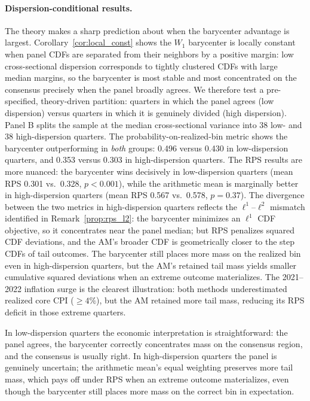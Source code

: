 \paragraph{Dispersion-conditional results.}  The theory makes a sharp prediction about when the barycenter advantage is largest.  Corollary~\ref{cor:local_const} shows the $W_1$ barycenter is locally constant when panel CDFs are separated from their neighbors by a positive margin: low cross-sectional dispersion corresponds to tightly clustered CDFs with large median margins, so the barycenter is most stable and most concentrated on the consensus precisely when the panel broadly agrees.  We therefore test a pre-specified, theory-driven partition: quarters in which the panel agrees (low dispersion) versus quarters in which it is genuinely divided (high dispersion).  Panel B splits the sample at the median cross-sectional variance into 38 low- and 38 high-dispersion quarters.  The probability-on-realized-bin metric shows the barycenter outperforming in \emph{both} groups: 0.496 versus 0.430 in low-dispersion quarters, and 0.353 versus 0.303 in high-dispersion quarters.  The RPS results are more nuanced: the barycenter wins decisively in low-dispersion quarters (mean RPS 0.301 vs.\ 0.328, $p < 0.001$), while the arithmetic mean is marginally better in high-dispersion quarters (mean RPS 0.567 vs.\ 0.578, $p = 0.37$).  The divergence between the two metrics in high-dispersion quarters reflects the $\ell^1$--$\ell^2$ mismatch identified in Remark~\ref{prop:rps_l2}: the barycenter minimizes an $\ell^1$ CDF objective, so it concentrates near the panel median; but RPS penalizes squared CDF deviations, and the AM's broader CDF is geometrically closer to the step CDFs of tail outcomes.  The barycenter still places more mass on the realized bin even in high-dispersion quarters, but the AM's retained tail mass yields smaller cumulative squared deviations when an extreme outcome materializes.  The 2021--2022 inflation surge is the clearest illustration: both methods underestimated realized core CPI ($\geq 4\%$), but the AM retained more tail mass, reducing its RPS deficit in those extreme quarters.

In low-dispersion quarters the economic interpretation is straightforward: the panel agrees, the barycenter correctly concentrates mass on the consensus region, and the consensus is usually right.  In high-dispersion quarters the panel is genuinely uncertain; the arithmetic mean's equal weighting preserves more tail mass, which pays off under RPS when an extreme outcome materializes, even though the barycenter still places more mass on the correct bin in expectation.

